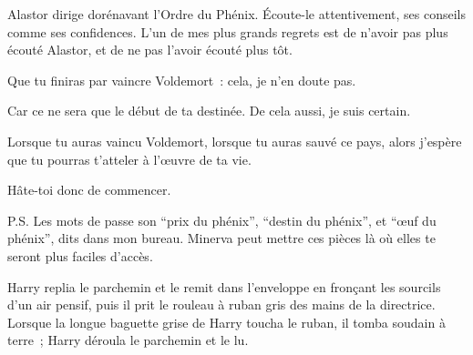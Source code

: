 \begin{writtenNote}
Alastor dirige dorénavant l'Ordre du Phénix. Écoute-le attentivement, ses conseils comme ses confidences. L'un de mes plus grands regrets est de n'avoir pas plus écouté Alastor, et de ne pas l'avoir écouté plus tôt.

Que tu finiras par vaincre Voldemort~: cela, je n'en doute pas.

Car ce ne sera que le début de ta destinée. De cela aussi, je suis certain.

Lorsque tu auras vaincu Voldemort, lorsque tu auras sauvé ce pays, alors j'espère que tu pourras t'atteler à l'œuvre de ta vie.

Hâte-toi donc de commencer.


P.S. Les mots de passe son “prix du phénix”, “destin du phénix”, et “œuf du phénix”, dits dans mon bureau. Minerva peut mettre ces pièces là où elles te seront plus faciles d'accès.
\end{writtenNote}

\later

Harry replia le parchemin et le remit dans l'enveloppe en fronçant les sourcils d'un air pensif, puis il prit le rouleau à ruban gris des mains de la directrice. Lorsque la longue baguette grise de Harry toucha le ruban, il tomba soudain à terre~; Harry déroula le parchemin et le lu.

